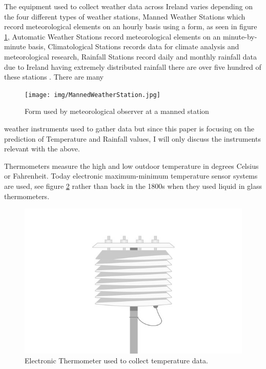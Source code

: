 The equipment used to collect weather data across Ireland varies depending on the four different types of weather stations, Manned Weather Stations which record meteorological elements on an hourly basis using a form, as seen in figure \ref{MetForm}, Automatic Weather Stations record meteorological elements on an minute-by-minute basis, Climatological Stations records data for climate analysis and meteorological research, Rainfall Stations record daily and monthly rainfall data due to Ireland having extremely distributed rainfall there are over five hundred of these stations \cite{MET}. There are many  

\begin{figure}[h]
\centering
\texttt{[image: img/MannedWeatherStation.jpg]}
\caption{Form used by meteorological observer at a manned station}
\label{MetForm}
\end{figure}
weather instruments used to gather data but since this paper is focusing on the prediction of Temperature and Rainfall values, I will only discuss the instruments relevant with the above.

Thermometers measure the high and low outdoor temperature in degrees Celsius or Fahrenheit. Today electronic maximum-minimum temperature sensor systems are used, see figure \ref{Thermometer} rather than back in the 1800s when they used liquid in glass thermometers.\cite{WeatherInstruments}

\begin{figure}[h]
\centering
\includegraphics[scale=0.2]{img/MaxMinThermometer.jpg}
\caption{Electronic Thermometer used to collect temperature data.}
\label{Thermometer}
\end{figure}

